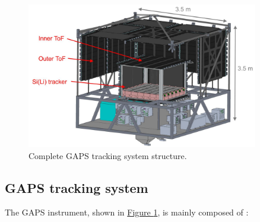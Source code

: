 \begin{figure}[ht]
    \centering
    \includegraphics[width=0.9\textwidth]{Images/appendGAPSintro/GAPS_tracker_structure.jpg}
    \caption{Complete GAPS tracking system structure.}
    \label{figGAPStrackerstructure}
\end{figure}


\subsection*{GAPS tracking system}
\label{gapsTrackingSystem}
The GAPS instrument, shown in \hyperref[figGAPStrackerstructure]{Figure \ref{figGAPStrackerstructure}}, is mainly composed of \cite{rogers_2019_largearea}:

